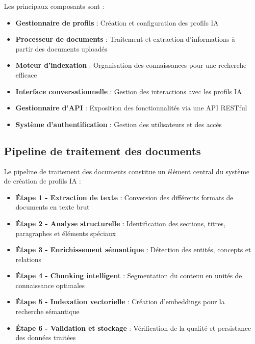 Les principaux composants sont :

\begin{itemize}
  \item \textbf{Gestionnaire de profils} : Création et configuration des profils IA
  
  \item \textbf{Processeur de documents} : Traitement et extraction d'informations à partir des documents uploadés
  
  \item \textbf{Moteur d'indexation} : Organisation des connaissances pour une recherche efficace
  
  \item \textbf{Interface conversationnelle} : Gestion des interactions avec les profils IA
  
  \item \textbf{Gestionnaire d'API} : Exposition des fonctionnalités via une API RESTful
  
  \item \textbf{Système d'authentification} : Gestion des utilisateurs et des accès
\end{itemize}

\subsection{Pipeline de traitement des documents}

Le pipeline de traitement des documents constitue un élément central du système de création de profils IA :

\begin{itemize}
  \item \textbf{Étape 1 - Extraction de texte} : Conversion des différents formats de documents en texte brut
  
  \item \textbf{Étape 2 - Analyse structurelle} : Identification des sections, titres, paragraphes et éléments spéciaux
  
  \item \textbf{Étape 3 - Enrichissement sémantique} : Détection des entités, concepts et relations
  
  \item \textbf{Étape 4 - Chunking intelligent} : Segmentation du contenu en unités de connaissance optimales
  
  \item \textbf{Étape 5 - Indexation vectorielle} : Création d'embeddings pour la recherche sémantique
  
  \item \textbf{Étape 6 - Validation et stockage} : Vérification de la qualité et persistance des données traitées
\end{itemize}

